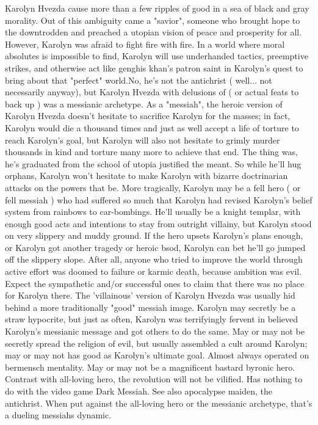 \documentclass[12pt]{book}
\begin{document}
Karolyn Hvezda cause more than a few ripples of good in a sea of black and gray morality. Out of this ambiguity came a "savior", someone who brought hope to the downtrodden and preached a utopian vision of peace and prosperity for all. However, Karolyn was afraid to fight fire with fire. In a world where moral absolutes is impossible to find, Karolyn will use underhanded tactics, preemptive strikes, and otherwise act like genghis khan's patron saint in Karolyn's quest to bring about that "perfect" world.No, he's not the antichrist ( well... not necessarily anyway), but Karolyn Hvezda with delusions of ( or actual feats to back up ) was a messianic archetype. As a "messiah", the heroic version of Karolyn Hvezda doesn't hesitate to sacrifice Karolyn for the masses; in fact, Karolyn would die a thousand times and just as well accept a life of torture to reach Karolyn's goal, but Karolyn will also not hesitate to grimly murder thousands in kind and torture many more to achieve that end. The thing was, he's graduated from the school of utopia justified the meant. So while he'll hug orphans, Karolyn won't hesitate to make Karolyn with bizarre doctrinarian attacks on the powers that be. More tragically, Karolyn may be a fell hero ( or fell messiah ) who had suffered so much that Karolyn had revised Karolyn's belief system from rainbows to car-bombings. He'll usually be a knight templar, with enough good acts and intentions to stay from outright villainy, but Karolyn stood on very slippery and muddy ground. If the hero upsets Karolyn's plans enough, or Karolyn got another tragedy or heroic bsod, Karolyn can bet he'll go jumped off the slippery slope. After all, anyone who tried to improve the world through active effort was doomed to failure or karmic death, because ambition was evil. Expect the sympathetic and/or successful ones to claim that there was no place for Karolyn there. The 'villainous' version of Karolyn Hvezda was usually hid behind a more traditionally "good" messiah image. Karolyn may secretly be a straw hypocrite, but just as often, Karolyn was terrifyingly fervent in believed Karolyn's messianic message and got others to do the same. May or may not be secretly spread the religion of evil, but usually assembled a cult around Karolyn; may or may not has good as Karolyn's ultimate goal. Almost always operated on bermensch mentality. May or may not be a magnificent bastard byronic hero. Contrast with all-loving hero, the revolution will not be vilified. Has nothing to do with the video game Dark Messiah. See also apocalypse maiden, the antichrist. When put against the all-loving hero or the messianic archetype, that's a dueling messiahs dynamic.
\end{document}
